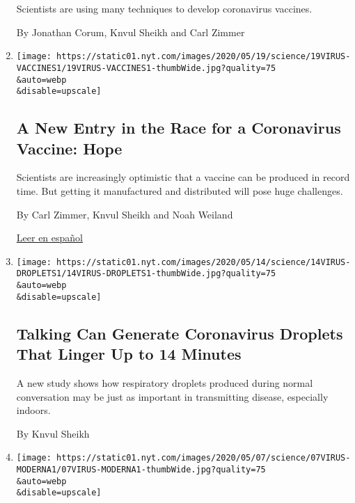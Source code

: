 \begin{enumerate}
  Scientists are using many techniques to develop coronavirus vaccines.

  By Jonathan Corum, Knvul Sheikh and Carl Zimmer
\item
  \href{/2020/05/20/health/coronavirus-vaccines.html}{}

  \texttt{[image: https://static01.nyt.com/images/2020/05/19/science/19VIRUS-VACCINES1/19VIRUS-VACCINES1-thumbWide.jpg?quality=75\\\&auto=webp\\\&disable=upscale]}

  \hypertarget{a-new-entry-in-the-race-for-a-coronavirus-vaccine-hope}{%
  \subsection{A New Entry in the Race for a Coronavirus Vaccine:
  Hope}\label{a-new-entry-in-the-race-for-a-coronavirus-vaccine-hope}}

  Scientists are increasingly optimistic that a vaccine can be produced
  in record time. But getting it manufactured and distributed will pose
  huge challenges.

  By Carl Zimmer, Knvul Sheikh and Noah Weiland

  \href{https://www.nytimes.com/es/2020/05/22/espanol/ciencia-y-tecnologia/vacuna-coronavirus.html}{Leer
  en español}
\item
  \href{/2020/05/14/health/coronavirus-infections.html}{}

  \texttt{[image: https://static01.nyt.com/images/2020/05/14/science/14VIRUS-DROPLETS1/14VIRUS-DROPLETS1-thumbWide.jpg?quality=75\\\&auto=webp\\\&disable=upscale]}

  \hypertarget{talking-can-generate-coronavirus-droplets-that-linger-up-to-14-minutes}{%
  \subsection{Talking Can Generate Coronavirus Droplets That Linger Up
  to 14
  Minutes}\label{talking-can-generate-coronavirus-droplets-that-linger-up-to-14-minutes}}

  A new study shows how respiratory droplets produced during normal
  conversation may be just as important in transmitting disease,
  especially indoors.

  By Knvul Sheikh
\item
  \href{/2020/05/07/health/coronavirus-vaccine-moderna.html}{}

  \texttt{[image: https://static01.nyt.com/images/2020/05/07/science/07VIRUS-MODERNA1/07VIRUS-MODERNA1-thumbWide.jpg?quality=75\\\&auto=webp\\\&disable=upscale]}


\end{enumerate}
